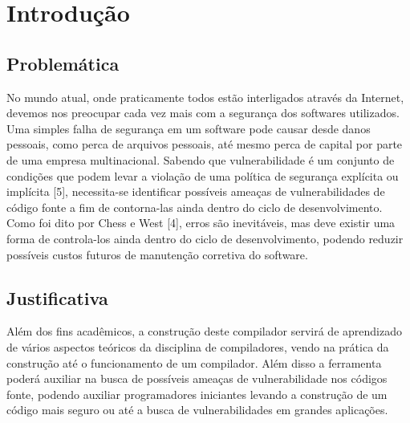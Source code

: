 \chapter[Introdução]{Introdução}

\section{Problemática}
No mundo atual, onde praticamente todos estão interligados através da Internet,
devemos nos preocupar cada vez mais com a segurança dos softwares utilizados. Uma
simples falha de segurança em um software pode causar desde danos pessoais, como perca
de arquivos pessoais, até mesmo perca de capital por parte de uma empresa multinacional. Sabendo que vulnerabilidade é um conjunto de condições que podem levar a violação de
uma política de segurança explícita ou implícita [5], necessita-se identificar possíveis ameaças de vulnerabilidades de código fonte a fim de contorna-las ainda dentro do ciclo de desenvolvimento.
Como foi dito por Chess e West [4], erros são inevitáveis, mas deve existir uma forma de controla-los ainda dentro do ciclo de desenvolvimento, podendo reduzir possíveis custos futuros de manutenção corretiva do software.

\section{Justificativa}
Além dos fins acadêmicos, a construção deste compilador servirá de aprendizado de vários aspectos teóricos da disciplina de compiladores, vendo na prática da construção até o funcionamento de um compilador. Além disso a ferramenta poderá auxiliar na busca de possíveis ameaças de vulnerabilidade nos códigos fonte, podendo auxiliar programadores iniciantes levando a construção de um código mais seguro ou até a busca de vulnerabilidades em grandes aplicações.



